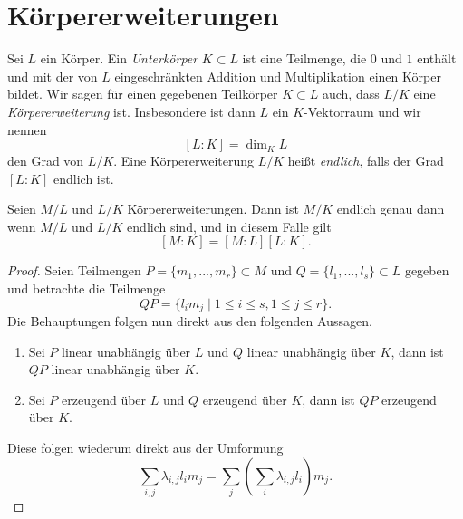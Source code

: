 \documentclass{book}
\begin{document}
\section{Körpererweiterungen}%
\label{sec:korpererweiterungen}

Sei $L$ ein Körper. Ein \emph{Unterkörper} $K \subset L$ ist eine Teilmenge,
die $0$ und $1$ enthält und mit der von $L$ eingeschränkten Addition und
Multiplikation einen Körper bildet. Wir sagen für einen gegebenen Teilkörper $K
\subset L$ auch, dass $L/K$ eine \emph{Körpererweiterung} ist. Insbesondere ist
dann $L$ ein $K$-Vektorraum und wir nennen
\[
    [L:K] = \dim_K L
\]
den Grad von $L/K$. Eine Körpererweiterung $L/K$ heißt \emph{endlich}, falls
der Grad $[L:K]$ endlich ist.

\begin{lem}
    \label{lem:grad}
    Seien $M/L$ und $L/K$ Körpererweiterungen. Dann ist $M/K$ endlich genau
    dann wenn $M/L$ und $L/K$ endlich sind, und in diesem Falle gilt
    \[
        [M:K] = [M:L][L:K].
    \]
\end{lem}
\begin{proof}
    Seien Teilmengen $P=\{m_1, ..., m_r\} \subset M$ und $Q=\{l_1, ..., l_s \} \subset L$ gegeben und betrachte die Teilmenge 
    \[
        QP = \{l_i m_j\; | \; 1 \le i \le s, 1 \le j \le r\}.
    \]
    Die Behauptungen folgen nun direkt aus den folgenden Aussagen. 
    \begin{enumerate}
        \item Sei $P$ linear unabhängig über $L$ und $Q$ linear unabhängig über
            $K$, dann ist $QP$ linear unabhängig über $K$.
        \item Sei $P$ erzeugend über $L$ und $Q$ erzeugend über
            $K$, dann ist $QP$ erzeugend über $K$.
    \end{enumerate}
    Diese folgen wiederum direkt aus der Umformung
    \[
        \sum_{i,j} \lambda_{i,j} l_i m_j = \sum_j ( \sum_{i} \lambda_{i,j} l_i ) m_j .
    \]
\end{proof}
\end{document}
